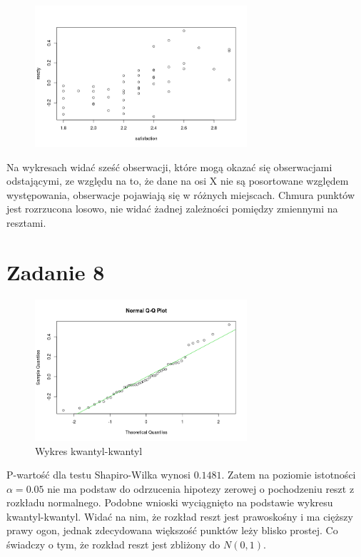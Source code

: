 \documentclass[9pt]{article}  %
\begin{document}
    \begin{figure}[H]
      \centering
      \includegraphics[width=0.7\textwidth]{74.png}
      \caption {}
    \end{figure} 
    
    Na wykresach widać sześć obserwacji, które mogą okazać się obserwacjami odstającymi, ze względu na to, że dane na osi X nie są posortowane względem występowania, obserwacje pojawiają się w różnych miejscach. Chmura punktów jest rozrzucona losowo, nie widać żadnej zależności pomiędzy zmiennymi na resztami.

\section{Zadanie 8}

    \begin{figure}[H]
      \centering
      \includegraphics[width=0.7\textwidth]{8.png}
      \caption {Wykres kwantyl-kwantyl}
    \end{figure} 
    
\indent P-wartość dla testu Shapiro-Wilka wynosi $0.1481$. Zatem na poziomie istotności $\alpha=0.05$ nie ma podstaw do odrzucenia hipotezy zerowej o pochodzeniu reszt z rozkładu normalnego. Podobne wnioski wyciągnięto na podstawie wykresu kwantyl-kwantyl. Widać na nim, że rozkład reszt jest prawoskośny i ma cięższy prawy ogon, jednak zdecydowana większość punktów leży blisko prostej. Co świadczy o tym, że rozkład reszt jest zbliżony do $N(0,1)$.
\end{document}
